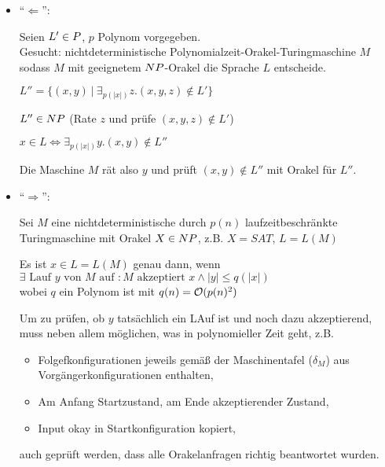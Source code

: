 \begin{beweis}
    
    \begin{itemize}

        
        \item ``$\Leftarrow$'':

            Seien $L' \in P$, $p$ Polynom vorgegeben.\\

            Gesucht: nichtdeterministische Polynomialzeit-Orakel-Turingmaschine $M$ sodass $M$ mit geeignetem $NP$-Orakel die Sprache $L$ entscheide.

            $L'' = \{ (x,y) \ |\  \exists_{p(|x|)} z . (x,y,z) \notin L' \} $

            $L'' \in NP$ (Rate $z$ und prüfe $(x,y,z) \notin L'$)

            $x \in L \Leftrightarrow \exists_{p(|x|)} y . (x,y) \notin L'' $

            Die Maschine $M$ rät also $y$ und prüft $(x,y) \notin L''$ mit Orakel für $L''$.

        \item ``$\Rightarrow$'':

            Sei $M$ eine nichtdeterministische durch $p(n)$ laufzeitbeschränkte Turingmaschine mit Orakel $X \in NP$, z.B. $X = SAT$, $L = L(M)$

            Es ist $x \in L = L(M)$ genau dann, wenn \\
            $\exists \text{ Lauf } y \text{ von } M \text{ auf }: 
            M \text{ akzeptiert } x \land |y| \leq q(|x|)$ \\
            wobei $q$ ein Polynom ist mit $q(n) = \mathcal{O}(p(n)^2)$

            Um zu prüfen, ob $y$ tatsächlich ein LAuf ist und noch dazu akzeptierend, muss neben allem möglichen, was in polynomieller Zeit geht, z.B. 
            \begin{itemize}
                \item Folgefkonfigurationen jeweils gemäß der Maschinentafel ($\delta_M$) aus Vorgängerkonfigurationen enthalten,
                \item Am Anfang Startzustand, am Ende akzeptierender Zustand,
                \item Input okay in Startkonfiguration kopiert,
            \end{itemize}
            auch geprüft werden, dass alle Orakelanfragen richtig beantwortet wurden.


\end{itemize}
\end{beweis}
